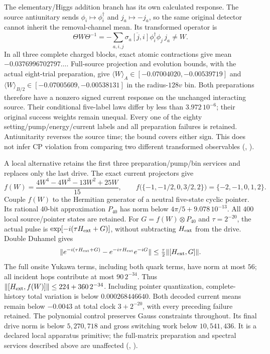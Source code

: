 The elementary/Higgs addition branch has its own calculated response.
The source antiunitary sends $\phi_i\mapsto\phi_i^\dagger$ and
$j_a\mapsto-j_a$, so the same original detector cannot inherit the
removal-channel mean. Its transformed operator is
\[
 \Theta W\Theta^{-1}
 =-\sum_{a,i,j}\overline{\sigma_a[j,i]}\phi_i^\dagger\phi_j\,j_a\ne W.
\]
In all three complete charged blocks, exact atomic contractions give
mean $-0.0376996702797\ldots$. Full-source projection and
evolution bounds, with the actual eight-trial preparation, give
$\langle W\rangle_A\in[-0.07004020,-0.00539719]$ and
$\langle W\rangle_{B/2}\in[-0.07005609,-0.00538131]$ in the radius-$128v$
bin. Both preparations therefore have a nonzero signed current response
on the unchanged interacting source. Their conditional five-label laws
differ by less than $3.972\,10^{-6}$; their original success weights
remain unequal. Every one of the eighty setting/pump/energy/current
labels and all preparation failures is retained. Antiunitarity reverses
the source time; the bound covers either sign. This does not infer CP
violation from comparing two different transformed observables
(, \cite{ophrepo}).

A local alternative retains the first three preparation/pump/bin services
and replaces only the last drive. The exact current projectors give
\[
 f(W)=\frac{4W^4-4W^3-13W^2+25W}{15},\qquad
 f\bigl(\{-1,-1/2,0,3/2,2\}\bigr)=\{-2,-1,0,1,2\}.
\]
Couple $f(W)$ to the Hermitian generator of a neutral five-state cyclic
pointer. Its rational $40$-bit approximation $P_{40}$ has norm below
$4\pi/5+9.078\,10^{-13}$. All $400$ local source/pointer states are
retained. For $G=f(W)\otimes P_{40}$ and $\tau=2^{-20}$, the actual
pulse is $\exp[-i(\tau H_{\rm ext}+G)]$, without subtracting
$H_{\rm ext}$ from the drive. Double Duhamel gives
\[
 \|e^{-i(\tau H_{\rm ext}+G)}-e^{-i\tau H_{\rm ext}}e^{-iG}\|
 \le\tfrac{\tau}{2}\|[H_{\rm ext},G]\|.
\]
The full onsite Yukawa terms, including both quark terms, have norm at
most $56$; all incident hops contribute at most $90\,2^{-34}$.
Thus $\|[H_{\rm ext},f(W)]\|\le224+360\,2^{-34}$.
Including pointer quantization, complete-history total variation is
below $0.000268446640$. Both decoded current means remain below
$-0.0043$ at total clock $3+2^{-20}$, with every preceding failure retained.
The polynomial control preserves Gauss constraints throughout.
Its final drive norm is below $5{,}270{,}718$ and gross switching work
below $10{,}541{,}436$. It is a declared local apparatus primitive;
the full-matrix preparation and spectral services described above are unaffected
(, \cite{ophrepo}).

